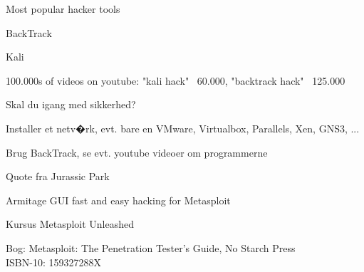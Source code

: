 \documentclass[20pt,landscape,a4paper,footrule]{foils}
\begin{document}
\vskip 5mm
\centerline{Most popular hacker tools }



\begin{list1}
\item BackTrack 
\item  Kali 
\item 100.000s of videos on youtube: "kali hack" ~60.000, "backtrack hack" ~125.000
\end{list1}




\begin{list1}
\item Skal du igang med sikkerhed?
\item Installer et netv�rk, evt. bare en VMware, Virtualbox, Parallels, Xen, GNS3, ...
\item Brug BackTrack, se evt. youtube videoer om programmerne
\end{list1}

Quote fra Jurassic Park





\begin{list1}
\item {}
\item Armitage GUI fast and easy hacking for Metasploit\\
\item Kursus Metasploit Unleashed\\
\item Bog: Metasploit: The Penetration Tester's Guide, No Starch Press\\
ISBN-10: 159327288X
\end{list1}



\end{document}
